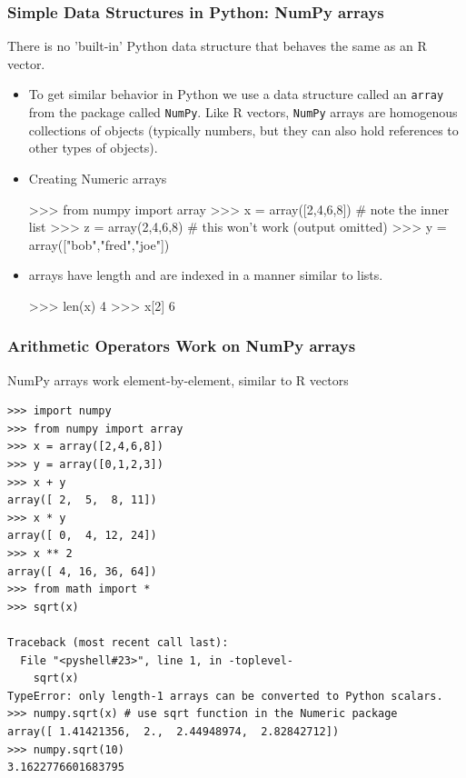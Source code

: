 \documentclass{beamer}
\begin{document}
\begin{frame}[fragile]
  \frametitle{Simple Data Structures in Python: NumPy arrays}

There is no 'built-in' Python data structure that behaves the same as an R vector.

\begin{itemize}

\item To get similar behavior in Python we use a data structure called an \texttt{array} from
the package called \texttt{NumPy}. Like R vectors, \texttt{NumPy} arrays are homogenous collections of objects (typically numbers, but they can also hold references to other types of objects).


	\item Creating Numeric arrays
\begin{Pcode}	
>>> from numpy import array 
>>> x = array([2,4,6,8]) # note the inner list
>>> z = array(2,4,6,8) # this won't work (output omitted)
>>> y = array(["bob","fred","joe"])
\end{Pcode}

\item arrays have length and are indexed in a manner similar to lists.
\begin{Pcode}	
>>> len(x)
4
>>> x[2]
6
\end{Pcode}

\end{itemize}

\end{frame}

\begin{frame}[fragile]
  \frametitle{Arithmetic Operators Work on NumPy arrays}

NumPy arrays work element-by-element, similar to R vectors

\begin{verbatim}
>>> import numpy
>>> from numpy import array
>>> x = array([2,4,6,8])
>>> y = array([0,1,2,3])
>>> x + y
array([ 2,  5,  8, 11])
>>> x * y
array([ 0,  4, 12, 24])
>>> x ** 2
array([ 4, 16, 36, 64])
>>> from math import *
>>> sqrt(x)

Traceback (most recent call last):
  File "<pyshell#23>", line 1, in -toplevel-
    sqrt(x)
TypeError: only length-1 arrays can be converted to Python scalars.
>>> numpy.sqrt(x) # use sqrt function in the Numeric package
array([ 1.41421356,  2.,  2.44948974,  2.82842712])
>>> numpy.sqrt(10) 
3.1622776601683795
\end{verbatim}

\end{frame}
\end{document}
